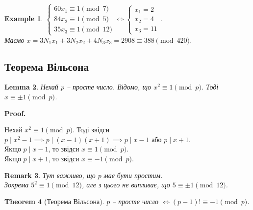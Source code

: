 \documentclass[a4paper, 10pt]{article}
\makeatletter
\theoremstyle{theoremdd}
\newtheorem{theorem}{Theorem}[subsection]
\theoremstyle{theoremdd}
\theoremstyle{theoremdd}
\theoremstyle{theoremdd}
\newtheorem{example}[theorem]{Example}
\theoremstyle{theoremdd}
\theoremstyle{theoremdd}
\newtheorem{remark}[theorem]{Remark}
\theoremstyle{theoremdd}
\newtheorem{lemma}[theorem]{Lemma}
\theoremstyle{theoremdd}
\renewenvironment{proof}[1][Proof.\\]{\par
\pushQED{\hfill \qed}%
\normalfont \topsep6\p@\@plus6\p@\relax
\trivlist
\item\relax
{\bfseries
#1\@addpunct{.}}\hspace\labelsep\ignorespaces
}{%
\popQED\endtrivlist\@endpefalse
}
\makeatother
\begin{document}
\begin{example}
$\begin{cases}
60x_1 \equiv 1 \pmod 7 \\
84x_2 \equiv 1 \pmod 5 \\
35x_3 \equiv 1 \pmod {12}
\end{cases} \iff \begin{cases}
x_1 = 2 \\
x_2 = 4 \\
x_3 = 11
\end{cases}$.\\
Маємо $x = 3N_1x_1 + 3N_2x_2 + 4N_3x_3 = 2908 \equiv 388 \pmod {420}$.
\end{example}


\subsection{Теорема Вільсона}
\begin{lemma}
Нехай $p$ -- просте число. Відомо, що $x^2 \equiv 1 \pmod p$. Тоді $x \equiv \pm 1 \pmod p$.
\end{lemma}

\begin{proof}
Нехай $x^2 \equiv 1 \pmod p$. Тоді звідси $p \mid x^2 - 1 \implies p \mid (x-1)(x+1) \implies p \mid x-1$ або $p \mid x+1$.\\
Якщо $p \mid x-1$, то звідси $x \equiv 1 \pmod p$.\\
Якщо $p \mid x+1$, то звідси $x \equiv -1 \pmod p$.
\end{proof}

\begin{remark}
Тут важливо, що $p$ має бути простим.\\
Зокрема $5^2 \equiv 1 \pmod {12}$, але з цього не випливає, що $5 \equiv \pm 1 \pmod {12}$.
\end{remark}

\begin{theorem}[Теорема Вільсона]
$p$ -- просте число $\iff (p-1)! \equiv -1 \pmod p$.
\end{theorem}
\end{document}
